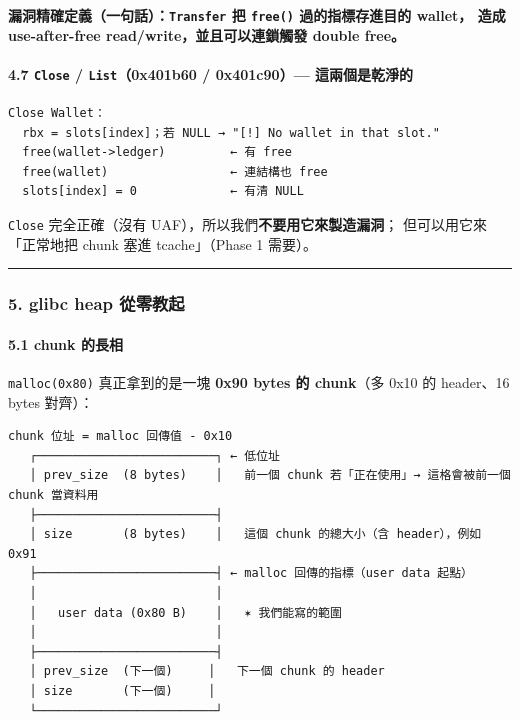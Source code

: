 \documentclass[10pt,a4paper]{article}
\begin{document}
\textbf{漏洞精確定義（一句話）：\texttt{Transfer} 把 \texttt{free()}
過的指標存進目的 wallet， 造成 use-after-free
read/write，並且可以連鎖觸發 double free。}

\paragraph{\texorpdfstring{4.7 \texttt{Close} / \texttt{List}（0x401b60
/ 0x401c90）---
這兩個是乾淨的}{4.7 Close / List（0x401b60 / 0x401c90）--- 這兩個是乾淨的}}\label{close-list0x401b60-0x401c90-ux9019ux5169ux500bux662fux4e7eux6de8ux7684}

\begin{Verbatim}[breaklines=true,breakanywhere=true,breakautoindent=false,fontsize=\fontsize{7.0}{9.5}\selectfont]
Close Wallet：
  rbx = slots[index]；若 NULL → "[!] No wallet in that slot."
  free(wallet->ledger)         ← 有 free
  free(wallet)                 ← 連結構也 free
  slots[index] = 0             ← 有清 NULL
\end{Verbatim}

\texttt{Close} 完全正確（沒有
UAF），所以我們\textbf{不要用它來製造漏洞}； 但可以用它來「正常地把
chunk 塞進 tcache」（Phase 1 需要）。

\begin{center}\rule{0.5\linewidth}{0.5pt}\end{center}

\subsubsection{5. glibc heap
從零教起}\label{glibc-heap-ux5f9eux96f6ux6559ux8d77}

\paragraph{5.1 chunk 的長相}\label{chunk-ux7684ux9577ux76f8}

\texttt{malloc(0x80)} 真正拿到的是一塊 \textbf{0x90 bytes 的 chunk}（多
0x10 的 header、16 bytes 對齊）：

\begin{Verbatim}[breaklines=true,breakanywhere=true,breakautoindent=false,fontsize=\fontsize{7.0}{9.5}\selectfont]
                chunk 位址 = malloc 回傳值 - 0x10
   ┌─────────────────────────┐ ← 低位址
   │ prev_size  (8 bytes)    │   前一個 chunk 若「正在使用」→ 這格會被前一個 chunk 當資料用
   ├─────────────────────────┤
   │ size       (8 bytes)    │   這個 chunk 的總大小（含 header），例如 0x91
   ├─────────────────────────┤ ← malloc 回傳的指標（user data 起點）
   │                         │
   │   user data (0x80 B)    │   ✶ 我們能寫的範圍
   │                         │
   ├─────────────────────────┤
   │ prev_size  (下一個)     │   下一個 chunk 的 header
   │ size       (下一個)     │
   └─────────────────────────┘
\end{Verbatim}
\end{document}
